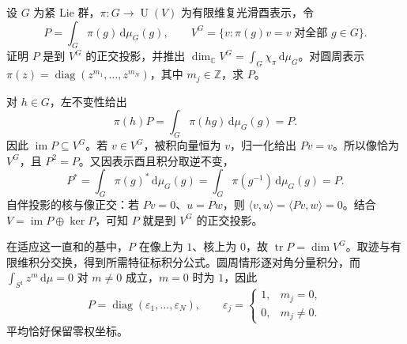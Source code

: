 \begin{exercise}\label{g1:ex:representation-average-fixed-vectors}
	设 \(G\) 为紧 Lie 群，\(\pi:G\to\operatorname{U}(V)\) 为有限维复光滑酉表示，令
	\[
		P=\int_G\pi(g)\,\mathrm{d}\mu_G(g),\qquad
		V^G=\{v:\pi(g)v=v\;\text{对全部 }g\in G\}.
	\]
	证明 \(P\) 是到 \(V^G\) 的正交投影，并推出 \(\dim_{\mathbb C}V^G=\int_G\chi_\pi\,\mathrm{d}\mu_G\)。对圆周表示 \(\pi(z)=\operatorname{diag}(z^{m_1},\ldots,z^{m_N})\)，其中 \(m_j\in\mathbb Z\)，求 \(P\)。
\end{exercise}
\begin{solution}
	对 \(h\in G\)，左不变性给出
	\[
		\pi(h)P=\int_G\pi(hg)\,\mathrm{d}\mu_G(g)=P.
	\]
	因此 \(\operatorname{im}P\subseteq V^G\)。若 \(v\in V^G\)，被积向量恒为 \(v\)，归一化给出 \(Pv=v\)。所以像恰为 \(V^G\)，且 \(P^2=P\)。又因表示酉且积分取逆不变，
	\[
		P^*=\int_G\pi(g)^*\,\mathrm{d}\mu_G(g)
		=\int_G\pi(g^{-1})\,\mathrm{d}\mu_G(g)=P.
	\]
	自伴投影的核与像正交：若 \(Pv=0\)、\(u=Pw\)，则 \(\langle v,u\rangle=\langle Pv,w\rangle=0\)。结合 \(V=\operatorname{im}P\oplus\ker P\)，可知 \(P\) 就是到 \(V^G\) 的正交投影。

	在适应这一直和的基中，\(P\) 在像上为 \(1\)、核上为 \(0\)，故 \(\operatorname{tr}P=\dim V^G\)。取迹与有限维积分交换，得到所需特征标积分公式。圆周情形逐对角分量积分，而 \(\int_{S^1}z^m\,\mathrm{d}\mu=0\) 对 \(m\ne0\) 成立，\(m=0\) 时为 \(1\)，因此
	\[
		P=\operatorname{diag}(\varepsilon_1,\ldots,\varepsilon_N),
		\qquad \varepsilon_j=\begin{cases}1,&m_j=0,\\0,&m_j\ne0.\end{cases}
	\]
	平均恰好保留零权坐标。
\end{solution}

